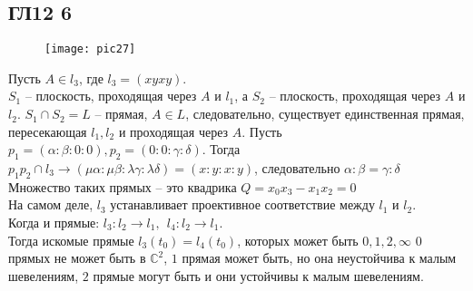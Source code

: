 \subsection*{ГЛ12 6}
\begin{figure}[h!]
	\center\texttt{[image: pic27]}
\end{figure}
Пусть $A \in l_3$, где $l_3 = (xyxy)$.\\
$S_1$ -- плоскость, проходящая через $A$ и $l_1$, а $S_2$ -- плоскость, проходящая через $A$ и $l_2$. $S_1 \cap S_2 = L$ -- прямая, $A \in L$, следовательно, существует единственная прямая, пересекающая $l_1, l_2$ и проходящая через $A$. 
\vskip 0.2in
\noindent
Пусть $p_1 = (\alpha : \beta : 0 : 0), p_2 = (0 : 0 : \gamma : \delta)$. Тогда $p_1p_2 \cap l_3 \rightarrow (\mu\alpha : \mu\beta : \lambda\gamma : \lambda\delta) = (x : y : x : y)$, следовательно $\alpha : \beta = \gamma : \delta$\\
\noindent
Множество таких прямых -- это квадрика $Q = x_0x_3 - x_1x_2 = 0$ \\
\noindent
На самом деле, $l_3$ устанавливает проективное соответствие между $l_1$ и $l_2$.\\
Когда и прямые: $l_3: l_2 \rightarrow l_1, \ \ l_4: l_2 \rightarrow l_1$.\\
Тогда искомые прямые $l_3(t_0) = l_4(t_0)$, которых может быть $0, 1, 2, \infty$
\vskip 0.2in
\noindent
$0$ прямых не может быть в $\mathbb{C}^2$, $1$ прямая может быть, но она неустойчива к малым шевелениям, $2$ прямые могут быть и они устойчивы к малым шевелениям.

